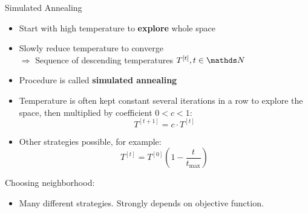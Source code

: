 \documentclass[11pt,compress,t,notes=noshow, xcolor=table]{beamer}
\begin{document}
\begin{vbframe}{Simulated Annealing}
\begin{itemize}
    \item Start with high temperature to \textbf{explore} whole space
    \item Slowly reduce temperature to converge \\
        $\Rightarrow$ Sequence of descending temperatures $T^{[t]}, t \in \N$
    \item Procedure is called \textbf{simulated annealing}
    \item Temperature is often kept constant several iterations in a row to explore the space, then multiplied by coefficient $0<c<1$:
        \begin{equation*}
            T^{[t+1]} = c \cdot T^{[t]}
        \end{equation*}
    \item Other strategies possible, for example:
        \begin{equation*}
            T^{[t]} = T^{[0]} \left( 1 - \frac{t}{t_{\text{max}}} \right)
        \end{equation*}
\end{itemize}

Choosing neighborhood:

\begin{itemize}
    \item Many different strategies.
        Strongly depends on objective function.
\end{itemize}



\end{vbframe}
\end{document}

